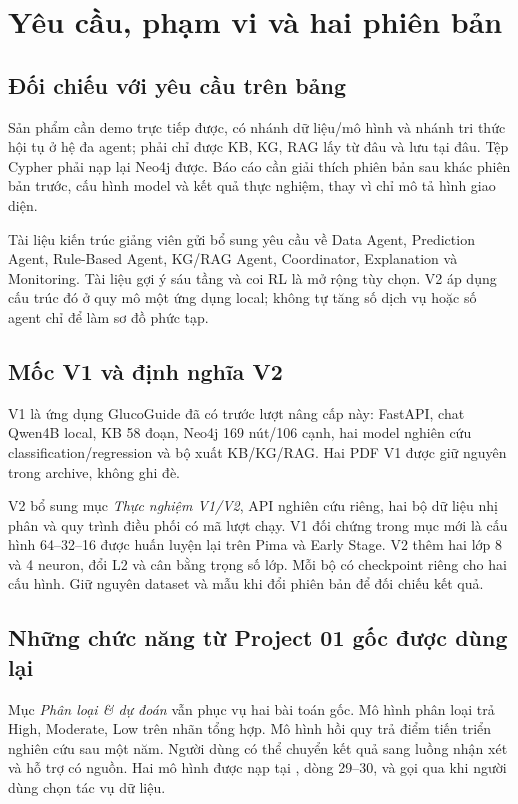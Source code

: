 \chapter{Yêu cầu, phạm vi và hai phiên bản}
\section{Đối chiếu với yêu cầu trên bảng}
Sản phẩm cần demo trực tiếp được, có nhánh dữ liệu/mô hình và nhánh tri thức hội tụ ở hệ đa agent; phải chỉ được KB, KG, RAG lấy từ đâu và lưu tại đâu. Tệp Cypher phải nạp lại Neo4j được. Báo cáo cần giải thích phiên bản sau khác phiên bản trước, cấu hình model và kết quả thực nghiệm, thay vì chỉ mô tả hình giao diện.

Tài liệu kiến trúc giảng viên gửi bổ sung yêu cầu về Data Agent, Prediction Agent, Rule-Based Agent, KG/RAG Agent, Coordinator, Explanation và Monitoring. Tài liệu gợi ý sáu tầng và coi RL là mở rộng tùy chọn. V2 áp dụng cấu trúc đó ở quy mô một ứng dụng local; không tự tăng số dịch vụ hoặc số agent chỉ để làm sơ đồ phức tạp.

\section{Mốc V1 và định nghĩa V2}
V1 là ứng dụng GlucoGuide đã có trước lượt nâng cấp này: FastAPI, chat Qwen4B local, KB 58 đoạn, Neo4j 169 nút/106 cạnh, hai model nghiên cứu classification/regression và bộ xuất KB/KG/RAG. Hai PDF V1 được giữ nguyên trong archive, không ghi đè.

V2 bổ sung mục \emph{Thực nghiệm V1/V2}, API nghiên cứu riêng, hai bộ dữ liệu nhị phân và quy trình điều phối có mã lượt chạy. V1 đối chứng trong mục mới là cấu hình 64--32--16 được huấn luyện lại trên Pima và Early Stage. V2 thêm hai lớp 8 và 4 neuron, đổi L2 và cân bằng trọng số lớp. Mỗi bộ có checkpoint riêng cho hai cấu hình. Giữ nguyên dataset và mẫu khi đổi phiên bản để đối chiếu kết quả.


\section{Những chức năng từ Project 01 gốc được dùng lại}
Mục \emph{Phân loại \& dự đoán} vẫn phục vụ hai bài toán gốc. Mô hình phân loại trả High, Moderate, Low trên nhãn tổng hợp. Mô hình hồi quy trả điểm tiến triển nghiên cứu sau một năm. Người dùng có thể chuyển kết quả sang luồng nhận xét và hỗ trợ có nguồn. Hai mô hình được nạp tại , dòng 29--30, và gọi qua  khi người dùng chọn tác vụ dữ liệu.

